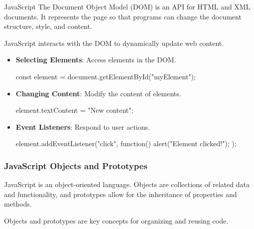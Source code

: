 \begin{notes}{JavaScript}
    The Document Object Model (DOM) is an API for HTML and XML documents. It represents the page so that programs can change the document structure, style, and content.
    
    \begin{highlight}
    
        JavaScript interacts with the DOM to dynamically update web content.
        
        \begin{itemize}
            \item \textbf{Selecting Elements}: Access elements in the DOM.
    \begin{code}[JavaScript]
    const element = document.getElementById("myElement");
    \end{code}
            \item \textbf{Changing Content}: Modify the content of elements.
    \begin{code}[JavaScript]
    element.textContent = "New content";
    \end{code}
            \item \textbf{Event Listeners}: Respond to user actions.
    \begin{code}[JavaScript]
    element.addEventListener("click", function() {
        alert("Element clicked!");
    });
    \end{code}
        \end{itemize}
    
    \end{highlight}
    
    \subsubsection*{JavaScript Objects and Prototypes}
    
    JavaScript is an object-oriented language. Objects are collections of related data and functionality, and prototypes allow for the inheritance of properties and methods.
    
    \begin{highlight}
    
        Objects and prototypes are key concepts for organizing and reusing code.
        

\end{highlight}
\end{notes}
